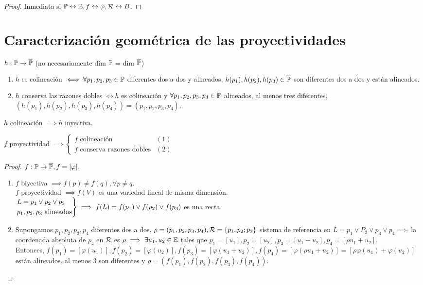 \begin{proof}
	Inmediata si $\mathbb{P} \leftrightarrow \mathbb{E}, f \leftrightarrow \varphi, \mathcal{R} \leftrightarrow B$.
\end{proof}

\section{Caracterización geométrica de las proyectividades}

\begin{defi}
	$h : \mathbb{P} \to \overline{\mathbb{P}}$ (no necesariamente dim $\mathbb{P}$ = dim $\overline{\mathbb{P}}$)
	\begin{enumerate}
		\item $h$ es colineación $\iff \forall p_1, p_2, p_3 \in \mathbb{P}$ diferentes dos a dos y alineados, $h(p_1), h(p_2), h(p_3) \in \overline{\mathbb{P}}$ son diferentes dos a dos y están alineados.
		\item $h$ conserva las razones dobles $\iff h$ es colineación y $\forall p_1, p_2, p_3, p_4 \in \mathbb{P}$ alineados, al menos tres diferentes, $(h(p_1), h(p_2), h(p_3), h(p_4)) = (p_1, p_2, p_3, p_4)$.
	\end{enumerate}
\end{defi}
\begin{obs}
	$h$ colineación $\implies h$ inyectiva.
\end{obs}
\begin{prop}
	$f$ proyectividad $\implies \begin{cases} f \text{ colineación} & (1) \label{coli} \\ f \text{ conserva razones dobles} & (2) \label{cons_raz_dob} \end{cases}$
\end{prop}
\begin{proof}
	$f : \mathbb{P} \to \overline{\mathbb{P}}, f = [\varphi]$,
	\begin{enumerate}[(1)]
		\item $f$ biyectiva $\implies f(p) \neq f(q), \forall p \neq q$. \\
		$f$ proyectividad $\implies f(V)$ es una variedad lineal de misma dimensión. \\
		$\begin{rcases}
		L = p_1 \vee p_2 \vee p_3 \\
		p_1, p_2, p_3 \text{ alineados}
		\end{rcases}
		\implies f(L) = f(p_1) \vee f(p_2) \vee f(p_3)$ es una recta.
		\item Supongamos $p_1, p_2, p_3, p_4$ diferentes dos a dos, $\rho = (p_1, p_2, p_3, p_4), \mathcal{R} = \{p_1, p_2; p_3\}$ sistema de referencia en $L = p_1 \vee P_2 \vee p_3 \vee p_4 \implies$ la coordenada absoluta de $p_4$ en $\mathcal{R}$ es $\rho \implies \exists u_1, u_2 \in \mathbb{E}$ tales que $p_1 = [u_1], p_2 = [u_2], p_3 = [u_1 + u_2], p_4 = [\rho u_1 + u_2]$. \\
		Entonces, $f(p_1) = [\varphi(u_1)], f(p_2) = [\varphi(u_2)], f(p_3) = [\varphi(u_1 + u_2)], f(p_4) = [\varphi(\rho u_1 + u_2)] = [\rho \varphi(u_1) + \varphi(u_2)]$ están alineados, al menos 3 son diferentes y $\rho = (f(p_1), f(p_2), f(p_3), f(p_4))$.
	\end{enumerate}
\end{proof}


